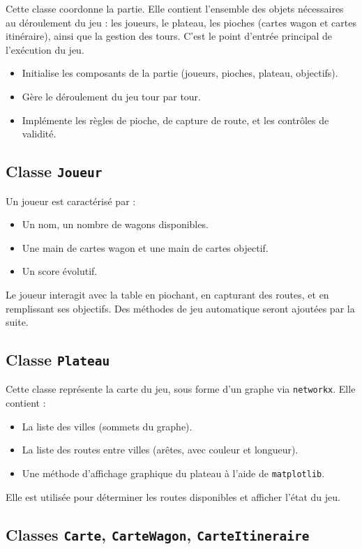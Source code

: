 \documentclass[a4paper,12pt]{report}
\begin{document}
Cette classe coordonne la partie. Elle contient l’ensemble des objets nécessaires au déroulement du jeu :
les joueurs, le plateau, les pioches (cartes wagon et cartes itinéraire), ainsi que la gestion des tours.
C’est le point d’entrée principal de l’exécution du jeu.

\begin{itemize}
    \item Initialise les composants de la partie (joueurs, pioches, plateau, objectifs).
    \item Gère le déroulement du jeu tour par tour.
    \item Implémente les règles de pioche, de capture de route, et les contrôles de validité.
\end{itemize}

\subsection*{Classe \texttt{Joueur}}

Un joueur est caractérisé par :
\begin{itemize}
    \item Un nom, un nombre de wagons disponibles.
    \item Une main de cartes wagon et une main de cartes objectif.
    \item Un score évolutif.
\end{itemize}
Le joueur interagit avec la table en piochant, en capturant des routes, et en remplissant ses objectifs.
Des méthodes de jeu automatique seront ajoutées par la suite.

\subsection*{Classe \texttt{Plateau}}

Cette classe représente la carte du jeu, sous forme d’un graphe via \texttt{networkx}. Elle contient :
\begin{itemize}
    \item La liste des villes (sommets du graphe).
    \item La liste des routes entre villes (arêtes, avec couleur et longueur).
    \item Une méthode d'affichage graphique du plateau à l’aide de \texttt{matplotlib}.
\end{itemize}
Elle est utilisée pour déterminer les routes disponibles et afficher l’état du jeu.

\subsection*{Classes \texttt{Carte}, \texttt{CarteWagon}, \texttt{CarteItineraire}}
\end{document}
